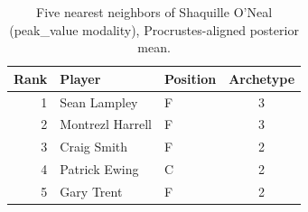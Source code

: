 \begin{table}[htbp]
  \centering\small
  \begin{tabular}{rllc}
    \toprule
    Rank & Player & Position & Archetype \\
    \midrule
    1 & Sean Lampley & F & 3 \\
    2 & Montrezl Harrell & F & 3 \\
    3 & Craig Smith & F & 2 \\
    4 & Patrick Ewing & C & 2 \\
    5 & Gary Trent & F & 2 \\
    \bottomrule
  \end{tabular}
  \caption{Five nearest neighbors of Shaquille O'Neal (peak_value modality), Procrustes-aligned posterior mean.}
  \label{tab:Shaquille_O_Neal_neighbors_peak_value}
\end{table}

